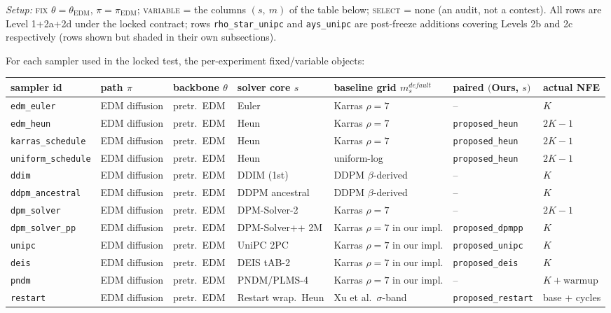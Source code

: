 \documentclass[11pt]{article}
\begin{document}
\noindent\textit{Setup:} \textsc{fix} \(\theta = \theta_{\mathrm{EDM}}\),
\(\pi = \pi_{\mathrm{EDM}}\); \textsc{variable} = the columns
\((s,\ m)\) of the table below; \textsc{select} = none (an audit, not
a contest). All rows are Level 1+2a+2d under the locked contract; rows
\texttt{rho\_star\_unipc} and \texttt{ays\_unipc} are post-freeze
additions covering Levels 2b and 2c respectively (rows shown but
shaded in their own subsections).

For each sampler used in the locked test, the per-experiment fixed/variable
objects:

\begin{center}
\scriptsize
\begin{tabular}{l l l l l l l}
\toprule
sampler id & path \(\pi\) & backbone \(\theta\) & solver core \(s\) & baseline grid \(m_s^{default}\) & paired \((\)Ours, \(s)\) & actual NFE \\
\midrule
\texttt{edm\_euler}        & EDM diffusion & pretr.\ EDM & Euler         & Karras \(\rho{=}7\)       & --                    & \(K\) \\
\texttt{edm\_heun}         & EDM diffusion & pretr.\ EDM & Heun          & Karras \(\rho{=}7\)       & \texttt{proposed\_heun} & \(2K{-}1\) \\
\texttt{karras\_schedule}  & EDM diffusion & pretr.\ EDM & Heun          & Karras \(\rho{=}7\)       & \texttt{proposed\_heun} & \(2K{-}1\) \\
\texttt{uniform\_schedule} & EDM diffusion & pretr.\ EDM & Heun          & uniform-log               & \texttt{proposed\_heun} & \(2K{-}1\) \\
\texttt{ddim}              & EDM diffusion & pretr.\ EDM & DDIM (1st)    & DDPM \(\beta\)-derived    & --                    & \(K\) \\
\texttt{ddpm\_ancestral}   & EDM diffusion & pretr.\ EDM & DDPM ancestral& DDPM \(\beta\)-derived    & --                    & \(K\) \\
\texttt{dpm\_solver}       & EDM diffusion & pretr.\ EDM & DPM-Solver-2  & Karras \(\rho{=}7\)       & --                    & \(2K{-}1\) \\
\texttt{dpm\_solver\_pp}   & EDM diffusion & pretr.\ EDM & DPM-Solver++ 2M & Karras \(\rho{=}7\) in our impl. & \texttt{proposed\_dpmpp} & \(K\) \\
\texttt{unipc}             & EDM diffusion & pretr.\ EDM & UniPC 2PC     & Karras \(\rho{=}7\) in our impl. & \texttt{proposed\_unipc} & \(K\) \\
\texttt{deis}              & EDM diffusion & pretr.\ EDM & DEIS tAB-2    & Karras \(\rho{=}7\) in our impl. & \texttt{proposed\_deis} & \(K\) \\
\texttt{pndm}              & EDM diffusion & pretr.\ EDM & PNDM/PLMS-4   & Karras \(\rho{=}7\) in our impl. & --        & \(K{+}\text{warmup}\) \\
\texttt{restart}           & EDM diffusion & pretr.\ EDM & Restart wrap.\ Heun & Xu et al.\ \(\sigma\)-band & \texttt{proposed\_restart} & base + cycles \\
\bottomrule
\end{tabular}
\end{center}
\end{document}
